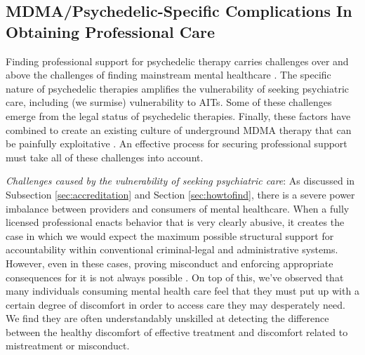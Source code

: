 \documentclass[12pt,letterpaper]{book}
\begin{document}
\subsection*{MDMA/Psychedelic-Specific Complications In Obtaining Professional Care}
\label{sec:mdmaTherapistComplications}

Finding professional support for psychedelic therapy carries challenges over and above the challenges of finding mainstream mental healthcare \cite{studyingHarms,patientVulnerability}. The specific nature of psychedelic therapies amplifies the vulnerability of seeking psychiatric care, including (we surmise) vulnerability to AITs. Some of these challenges emerge from the legal status of psychedelic therapies. Finally, these factors have combined to create an existing culture of underground MDMA therapy that can be painfully exploitative \cite{powerTrip}. An effective process for securing professional support must take all of these challenges into account.

\textit{Challenges caused by the vulnerability of seeking psychiatric care}: As discussed in Subsection \ref{sec:accreditation} and Section \ref{sec:howtofind}, there is a severe power imbalance between providers and consumers of mental healthcare. When a fully licensed professional enacts behavior that is very clearly abusive, it creates the case in which we would expect the maximum possible structural support for accountability within conventional criminal-legal and administrative systems. However, even in these cases, proving misconduct and enforcing appropriate consequences for it is not always possible \cite{biaggio1998obstacles}. On top of this, we've observed that many individuals consuming mental health care feel that they must put up with a certain degree of discomfort in order to access care they may desperately need. We find they are often understandably unskilled at detecting the difference between the healthy discomfort of effective treatment \cite{eckerUnlocking} and discomfort related to mistreatment or misconduct. 
\end{document}

